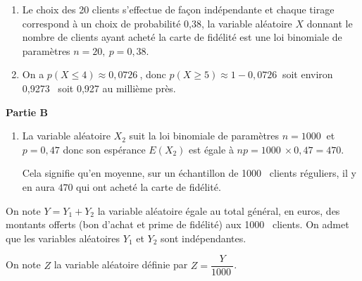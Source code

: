 \documentclass[10pt]{article}
\providecommand{\np}[2][]{{#2~#1}}
\begin{document}
\begin{enumerate}
	\begin{enumerate}
		\item 
	Le choix des 20 clients s'effectue de façon indépendante  et chaque tirage correspond à un choix de probabilité 0,38, la variable aléatoire $X$ donnant le nombre de clients ayant acheté la carte de fidélité est une loi binomiale de paramètres $n = 20, \:p = 0,38$.
		\item 
		On a $p(X \leqslant 4) \approx \np{0,0726}$, donc $p(X \geqslant 5) \approx 1 - \np{0,0726}$ soit environ \np{0,9273} soit 0,927 au millième près.
	\end{enumerate}
\end{enumerate}

\medskip

\textbf{Partie B}

\medskip


















\medskip

\begin{enumerate}
\item 
La variable aléatoire $X_2$ suit la loi binomiale de paramètres $n=\np{1000}$ et $p=0,47$ donc son espérance $E(X_2)$ est égale à $np=\np{1000}\times 0,47=470$.

Cela signifie qu'en moyenne, sur un échantillon de \np{1000} clients réguliers, il y en aura $470$ qui ont acheté la carte de fidélité.
\end{enumerate}

On note $Y = Y_1 + Y_2$ la variable aléatoire égale au total général, en euros, des montants offerts (bon d'achat et prime de fidélité) aux \np{1000} clients. On admet que les variables aléatoires $Y_1$ et $Y_2$ sont indépendantes.

On note $Z$ la variable aléatoire définie par $Z = \dfrac{Y}{\np{1000}}$.
\end{document}

